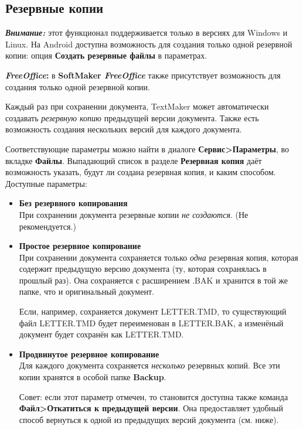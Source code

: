 ﻿\documentclass[a4paper,10pt]{article}
\begin{document}
\subsection{Резервные копии}
\begin{mdframed}[backgroundcolor=blue!10]
\textbf{\textit{Внимание:}} этот функционал поддерживается только в версиях для Windows и Linux. На Android доступна возможность для создания только одной резервной копии: опция \textbf{Создать резервные файлы} в параметрах.
\end{mdframed}

\begin{mdframed}[backgroundcolor=pink!50]
\textbf{\textit{FreeOffice}:} в \textbf{SoftMaker \textit{FreeOffice}} также присутствует возможность для создания только одной резервной копии.
\end{mdframed}

Каждый раз при сохранении документа, TextMaker может автоматически создавать \textit{резервную копию} предыдущей версии документа. Также есть возможность создания нескольких версий для каждого документа.

Соответствующие параметры можно найти в диалоге \textbf{Сервис>Параметры}, во вкладке \textbf{Файлы}. Выпадающий список в разделе \textbf{Резервная копия} даёт возможность указать, будут ли создана резервная копия, и каким способом. Доступные параметры:

\begin{itemize}
 \item \textbf{Без резервного копирования}\\
 При сохранении документа резервные копии \textit{не создаются}. (Не рекомендуется.)
 \item \textbf{Простое резервное копирование}\\
 При сохранении документа сохраняется только \textit{одна} резервная копия, которая содержит предыдущую версию документа (ту, которая сохранялась в прошлый раз). Она сохраняется с расширением .BAK и хранится в той же папке, что и оригинальный документ.
 
 Если, например, сохраняется документ LETTER.TMD, то существующий файл LETTER.TMD будет переименован в LETTER.BAK, а изменёный документ будет сохранён как LETTER.TMD.
 \item \textbf{Продвинутое резервное копирование}\\
 Для каждого документа сохраняется \textit{несколько} резервных копий. Все эти копии хранятся в особой папке \textbf{Backup}.
 
 Совет: если этот параметр отмечен, то становится доступна также команда \textbf{Файл>Откатиться к предыдущей версии}. Она предоставляет удобный способ вернуться к одной из предыдущих версий документа (см. ниже).
 \end{itemize}
 
\end{document}
